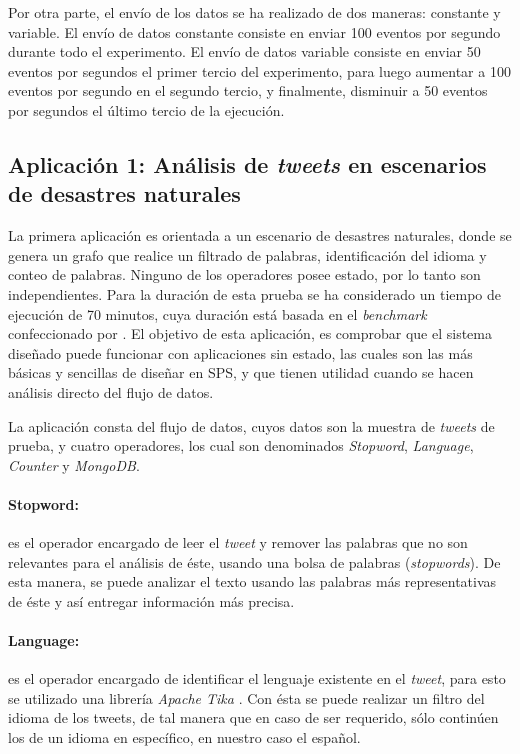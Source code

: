 Por otra parte, el envío de los datos se ha realizado de dos maneras: constante y variable. El envío de datos constante consiste en enviar 100 eventos por segundo durante todo el experimento. El envío de datos variable consiste en enviar 50 eventos por segundos el primer tercio del experimento, para luego aumentar a 100 eventos por segundo en el segundo tercio, y finalmente, disminuir a 50 eventos por segundos el último tercio de la ejecución.

\subsection{Aplicación 1: Análisis de \textit{tweets} en escenarios de desastres naturales}
La primera aplicación es orientada a un escenario de desastres naturales, donde se genera un grafo que realice un filtrado de palabras, identificación del idioma y conteo de palabras. Ninguno de los operadores posee estado, por lo tanto son independientes. Para la duración de esta prueba se ha considerado un tiempo de ejecución de 70 minutos, \normalsize{cuya duración está basada en el \textit{benchmark} confeccionado por} \citep{ArasuCGMMRST04}. El objetivo de esta aplicación, es comprobar que el sistema diseñado puede funcionar con aplicaciones sin estado, las cuales son las más básicas y sencillas de diseñar en SPS, y que tienen utilidad cuando se hacen análisis directo del flujo de datos.

La aplicación consta del flujo de datos, cuyos datos son la muestra de \textit{tweets} de prueba, y cuatro operadores, los cual son denominados \textit{Stopword}, \textit{Language}, \textit{Counter} y \textit{MongoDB}.

\paragraph{Stopword:} es el operador encargado de leer el \textit{tweet} y remover las palabras que no son relevantes para el análisis de éste, usando una bolsa de palabras (\textit{stopwords}). De esta manera, se puede analizar el texto usando las palabras más representativas de éste y así entregar información más precisa.

\paragraph{Language:} es el operador encargado de identificar el lenguaje existente en el \textit{tweet}, para esto se utilizado una librería \textit{Apache Tika} \citep{mattmann2011tika}. Con ésta se puede realizar un filtro del idioma de los tweets, de tal manera que en caso de ser requerido, sólo continúen los de un idioma en específico, en nuestro caso el español.

